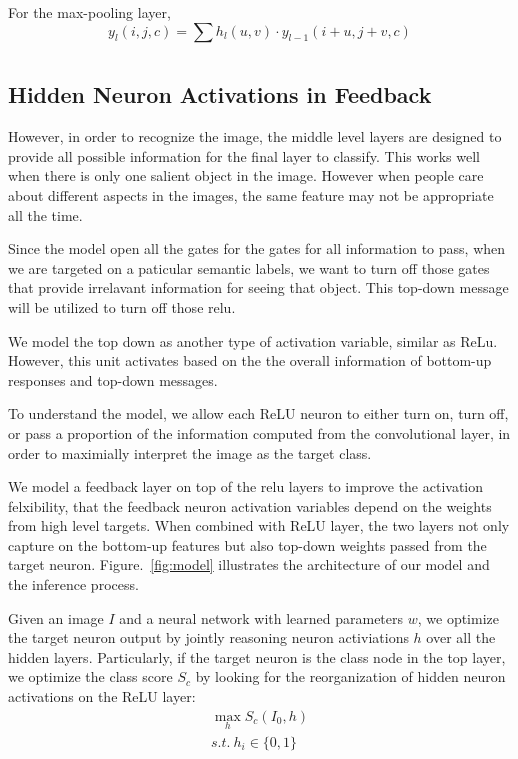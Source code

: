 For the max-pooling layer,
\begin{equation}
y_l(i,j,c) = \sum_{} h_l(u, v) \cdot y_{l-1}(i+u, j+v, c)
\end{equation}

\subsection{Hidden Neuron Activations in Feedback}
However, in order to recognize the image, the middle level layers are designed to provide all possible information for the final layer to classify. This works well when there is only one salient object in the image. However when people care about different aspects in the images, the same feature may not be appropriate all the time. 

Since the model open all the gates for the gates for all information to pass, when we are targeted on a paticular semantic labels, we want to turn off those gates that provide irrelavant information for seeing that object. This top-down message will be utilized to turn off those relu.

We model the top down as another type of activation variable, similar as ReLu. However, this unit activates based on the the overall information of bottom-up responses and top-down messages. 

To understand the model, we allow each ReLU neuron to either turn on, turn off, or pass a proportion of the information computed from the convolutional layer, in order to maximially interpret the image as the target class.

We model a feedback layer on top of the relu layers to improve the activation felxibility, that the feedback neuron activation variables depend on the weights from high level targets. When combined with ReLU layer, the two layers not only capture on the bottom-up features but also top-down weights passed from the target neuron. Figure.~\ref{fig:model} illustrates the architecture of our model and the inference process. 
 
Given an image $I$ and a neural network with learned parameters $w$, we optimize the target neuron output by jointly reasoning neuron activiations $h$ over all the hidden layers. Particularly, if the target neuron is the class node in the top layer, we optimize the class score $S_c$ by looking for the reorganization of hidden neuron activations on the ReLU layer:
\begin{equation}
\begin{aligned}
  \max_h S_c(I_0, h) \\
  s.t.\ h_i \in \{0, 1\}
\end{aligned}
\end{equation}

